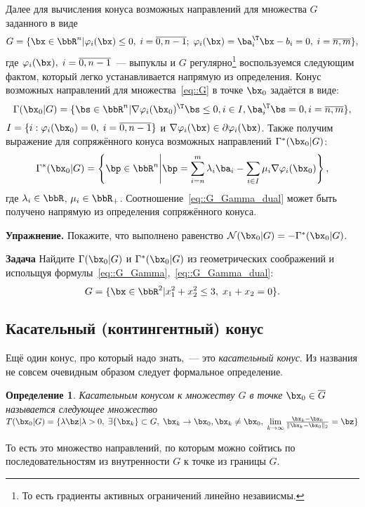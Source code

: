 \documentclass[12pt]{article}
\newtheorem{Def}{ Определение}
\begin{document}
Далее для вычисления конуса возможных направлений для множества $G$ заданного в виде
\begin{equation}
G = \{ \bx \in \bbR^n | \varphi_i(\bx) \leq 0, \; i = \overline{0,n-1}; \; \varphi_i(\bx) = \ba_i^{\T}\bx - b_i = 0, \; i = \overline{n, m} \},
\label{eq::G}
\end{equation}
где $\varphi_i(\bx), \; i = \overline{0,n-1}$~--- выпуклы и $G$ регулярно\footnote{То есть градиенты активных ограничений линейно незавиисмы.} воспользуемся следующим фактом, который легко устанавливается напрямую из определения.
Конус возможных направлений для множества~\eqref{eq::G} в точке $\bx_0$ задаётся в виде:
\begin{equation}
\Gamma(\bx_0|G) = \{ \bs \in \bbR^n | \nabla \varphi_i(\bx_0)^{\T} \bs \leq 0, i \in I, \ba^{\T}_i \bs = 0, i = \overline{n,m} \},
\label{eq::G_Gamma}
\end{equation}
$I = \{i: \varphi_i(\bx_0) = 0, \; i = \overline{0,n-1}\}$ и $\nabla \varphi_i(\bx) \in \partial \varphi_i(\bx)$.
Также получим выражение для сопряжённого конуса возможных направлений $\Gamma^*(\bx_0|G)$:
\begin{equation}
\Gamma^*(\bx_0|G) = \left \{ \bp \in \bbR^n \middle\rvert \bp = \sum\limits_{i = n}^m \lambda_i\ba_i - \sum\limits_{i \in I} \mu_i \nabla\varphi_i(\bx_0) \right \},
\label{eq::G_Gamma_dual}
\end{equation} 
где $\lambda_i \in \bbR$, $\mu_i \in \bbR_+$.
Соотношение~\eqref{eq::G_Gamma_dual} может быть получено напрямую из определения сопряжённого конуса.

\textbf{Упражнение.} Покажите, что выполнено равенство $\mathcal{N}(\bx_0|G) = -\Gamma^*(\bx_0|G)$.

\textbf{Задача} Найдите $\Gamma(\bx_0|G)$ и $\Gamma^*(\bx_0|G)$ из геометрических соображений и испольщуя формулы~\eqref{eq::G_Gamma},~\eqref{eq::G_Gamma_dual}:
\[
G = \{ \bx \in \bbR^2 | x_1^2 + x_2^2 \leq 3, \; x_1 + x_2 = 0 \}.
\]

\subsection{Касательный (контингентный) конус}
Ещё один конус, про который надо знать,~--- это \emph{касательный конус}.
Из названия не совсем очевидным образом следует формальное определение.
\begin{Def}
Касательным конусом к множеству $G$ в точке $\bx_0 \in \overline{G}$ называется следующее множество $T(\bx_0 |G) = \{ \lambda \bz | \lambda > 0, \; \exists \{\bx_k\} \subset G, \; \bx_k \rightarrow \bx_0, \bx_k \neq \bx_0, \; \lim\limits_{k \rightarrow \infty} \frac{\bx_k - \bx_0}{\|\bx_k - \bx_0\|_2} = \bz \}$
\end{Def}
То есть это множество направлений, по которым можно сойтись по последовательностям из внутренности $G$ к точке из границы $G$.
\end{document}
